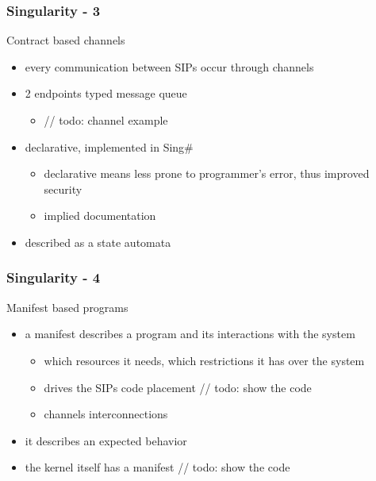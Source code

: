 \begin{frame}
  \frametitle{Singularity - 3}
  Contract based channels
  \begin{itemize}
    \item every communication between SIPs occur through channels
    \item 2 endpoints typed message queue
      \begin{itemize} \item // todo: channel example \end{itemize}
    \item declarative, implemented in Sing\#
      \begin{itemize}
        \item declarative means less prone to programmer's error, thus improved security
        \item implied documentation
      \end{itemize}
    \item described as a state automata
  \end{itemize}
\end{frame}


\begin{frame}
  \frametitle{Singularity - 4}
  Manifest based programs
  \begin{itemize}
    \item a manifest describes a program and its interactions with the system
    \begin{itemize}
      \item which resources it needs, which restrictions it has over the system
      \item drives the SIPs code placement // todo: show the code
      \item channels interconnections
    \end{itemize}
    \item it describes an expected behavior
    \item the kernel itself has a manifest // todo: show the code
  \end{itemize}
\end{frame}


